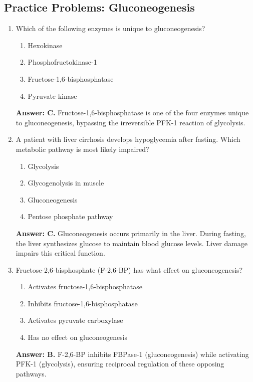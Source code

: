 \subsection{Practice Problems: Gluconeogenesis}

\begin{enumerate}
    \item Which of the following enzymes is unique to gluconeogenesis?
    \begin{enumerate}[label=\Alph*.]
        \item Hexokinase
        \item Phosphofructokinase-1
        \item Fructose-1,6-bisphosphatase
        \item Pyruvate kinase
    \end{enumerate}
    
    \textbf{Answer: C.} Fructose-1,6-bisphosphatase is one of the four enzymes unique to gluconeogenesis, bypassing the irreversible PFK-1 reaction of glycolysis.
    
    \item A patient with liver cirrhosis develops hypoglycemia after fasting. Which metabolic pathway is most likely impaired?
    \begin{enumerate}[label=\Alph*.]
        \item Glycolysis
        \item Glycogenolysis in muscle
        \item Gluconeogenesis
        \item Pentose phosphate pathway
    \end{enumerate}
    
    \textbf{Answer: C.} Gluconeogenesis occurs primarily in the liver. During fasting, the liver synthesizes glucose to maintain blood glucose levels. Liver damage impairs this critical function.
    
    \item Fructose-2,6-bisphosphate (F-2,6-BP) has what effect on gluconeogenesis?
    \begin{enumerate}[label=\Alph*.]
        \item Activates fructose-1,6-bisphosphatase
        \item Inhibits fructose-1,6-bisphosphatase
        \item Activates pyruvate carboxylase
        \item Has no effect on gluconeogenesis
    \end{enumerate}
    
    \textbf{Answer: B.} F-2,6-BP inhibits FBPase-1 (gluconeogenesis) while activating PFK-1 (glycolysis), ensuring reciprocal regulation of these opposing pathways.
\end{enumerate}

